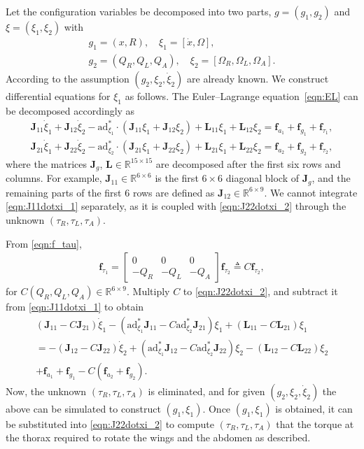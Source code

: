 \documentclass[10pt]{article}
\renewcommand{\Re}{\ensuremath{\mathbb{R}}}
\newcommand{\ad}{\ensuremath{\mathrm{ad}}}
\begin{document}
Let the configuration variables be decomposed into two parts, $g=(g_1,g_2)$ and $\xi=(\xi_1,\xi_2)$ with
\begin{gather}
    g_1 = (x, R), \quad \xi_1 = [\dot x, \Omega], \label{eqn:g1xi1}\\
    g_2 = (Q_R, Q_L, Q_A), \quad \xi_2 = [\Omega_R, \Omega_L, \Omega_A].\label{eqn:g2xi2}
\end{gather}
According to the assumption $(g_2,\xi_2,\dot\xi_2)$ are already known. 
We construct differential equations for $\xi_1$ as follows. 
The Euler--Lagrange equation~\eqref{eqn:EL} can be decomposed accordingly as
\begin{align}
    \mathbf{J}_{11}\dot \xi_1 + \mathbf{J}_{12}\dot\xi_2 -\ad^*_{\xi_1}\cdot(\mathbf{J}_{11}\xi_1 + \mathbf{J}_{12}\xi_2) + \mathbf{L}_{11}\xi_1 + \mathbf{L}_{12}\xi_2 = \mathbf{f}_{a_1} + \mathbf{f}_{g_1} + \mathbf{f}_{\tau_1},\label{eqn:J11dotxi_1}\\
    \mathbf{J}_{21}\dot \xi_1 + \mathbf{J}_{22}\dot\xi_2 -\ad^*_{\xi_2}\cdot(\mathbf{J}_{21}\xi_1 + \mathbf{J}_{22}\xi_2) + \mathbf{L}_{21}\xi_1 + \mathbf{L}_{22}\xi_2 = \mathbf{f}_{a_2} + \mathbf{f}_{g_2} + \mathbf{f}_{\tau_2},\label{eqn:J22dotxi_2}
\end{align}
where the matrices $\mathbf{J}_g$, $\mathbf{L}\in\Re^{15\times 15}$ are decomposed after the first six rows and columns. 
For example, $\mathbf{J}_11\in\Re^{6\times 6}$ is the first $6\times 6$ diagonal block of $\mathbf{J}_g$, and the remaining parts of the first 6 rows are defined as $\mathbf{J}_{12}\in\Re^{6\times 9}$. 
We cannot integrate \eqref{eqn:J11dotxi_1} separately, as it is coupled with \eqref{eqn:J22dotxi_2} through the unknown $(\tau_R,\tau_L,\tau_A)$.

From \eqref{eqn:f_tau},
\begin{align*}
    \mathbf{f}_{\tau_1} = \begin{bmatrix} 0 & 0 & 0 \\
    -Q_R & -Q_L & -Q_A \end{bmatrix} \mathbf{f}_{\tau_2} 
    \triangleq C \mathbf{f}_{\tau_2},
\end{align*}
for $C(Q_R,Q_L,Q_A)\in\Re^{6\times 9}$. 
Multiply $C$ to \eqref{eqn:J22dotxi_2}, and subtract it from \eqref{eqn:J11dotxi_1} to obtain
\begin{gather}
    (\mathbf{J}_{11}-C\mathbf{J}_{21})\dot \xi_1 -(\ad^*_{\xi_1}\mathbf{J}_{11}-C\ad^*_{\xi_2} \mathbf{J}_{21} )\xi_1 + (\mathbf{L}_{11}-C\mathbf{L}_{21})\xi_1 \nonumber \\ 
=   - (\mathbf{J}_{12}-C\mathbf{J}_{22})\dot \xi_2 +(\ad^*_{\xi_1}\mathbf{J}_{12}-C\ad^*_{\xi_2} \mathbf{J}_{22} )\xi_2 - (\mathbf{L}_{12}-C\mathbf{L}_{22})\xi_2 \nonumber \\ 
+ \mathbf{f}_{a_1}+\mathbf{f}_{g_1}-C(\mathbf{f}_{a_2}+\mathbf{f}_{g_2}).
\end{gather}
Now, the unknown $(\tau_R,\tau_L,\tau_A)$ is eliminated, and for given $(g_2,\xi_2,\dot\xi_2)$ the above can be simulated to construct $(g_1,\xi_1)$. 
Once $(g_1,\xi_1)$ is obtained, it can be substituted into \eqref{eqn:J22dotxi_2} to compute $(\tau_R,\tau_L,\tau_A)$ that the torque at the thorax required to rotate the wings and the abdomen as described. 
\end{document}
